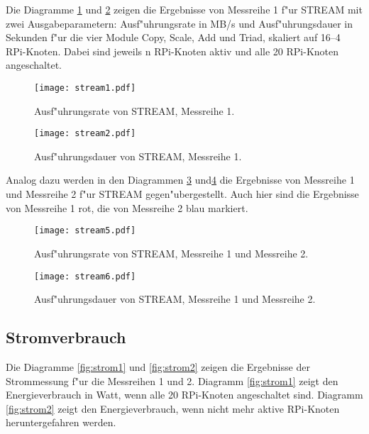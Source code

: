 Die Diagramme \ref{fig:stream1} und \ref{fig:stream2} zeigen die Ergebnisse von Messreihe 1 f"ur STREAM mit zwei Ausgabeparametern: Ausf"uhrungsrate in MB/s und Ausf"uhrungsdauer in Sekunden f"ur die vier Module Copy, Scale, Add und Triad, skaliert auf 16--4 RPi-Knoten. Dabei sind jeweils n RPi-Knoten aktiv und alle 20 RPi-Knoten angeschaltet.  
\begin{figure}[htb]
  \centering
  \texttt{[image: stream1.pdf]}\\ 
  \caption{Ausf"uhrungsrate von STREAM, Messreihe 1.}
  \label{fig:stream1}		
\end{figure}
\begin{figure}[htb]
  \centering
  \texttt{[image: stream2.pdf]}\\ 
  \caption{Ausf"uhrungsdauer von STREAM, Messreihe 1.}
  \label{fig:stream2}		
\end{figure}
\newpage
\noindent
Analog dazu werden in den Diagrammen \ref{fig:stream5} und\ref{fig:stream6} die Ergebnisse von Messreihe 1 und Messreihe 2 f"ur STREAM gegen"ubergestellt. Auch hier sind die Ergebnisse von Messreihe 1 rot, die von Messreihe 2 blau markiert. 
\begin{figure}[htb]
  \centering
  \texttt{[image: stream5.pdf]}\\ 
  \caption{Ausf"uhrungsrate von STREAM, Messreihe 1 und Messreihe 2.}\label{fig:stream5}
\end{figure}
\begin{figure}[htb]
  \centering
  \texttt{[image: stream6.pdf]}\\ 
  \caption{Ausf"uhrungsdauer von STREAM, Messreihe 1 und Messreihe 2.}\label{fig:stream6}
\end{figure}
\newpage
\subsection{Stromverbrauch}\label{Ergebnisse-Energiegenie}

Die Diagramme \ref{fig:strom1} und \ref{fig:strom2} zeigen die Ergebnisse der Strommessung f"ur die Messreihen 1 und 2. Diagramm \ref{fig:strom1} zeigt den Energieverbrauch in Watt, wenn alle 20 RPi-Knoten angeschaltet sind. Diagramm \ref{fig:strom2} zeigt den Energieverbrauch, wenn nicht mehr aktive RPi-Knoten heruntergefahren werden. 
\endinput 


